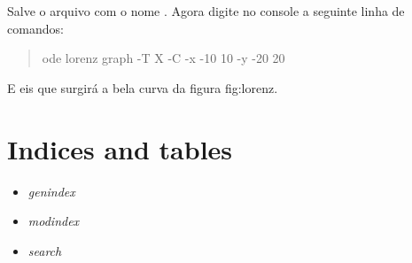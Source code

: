 \documentclass[a4paper,10pt,portuguese]{sphinxmanual}
\begin{document}
Salve o arquivo com o nome . Agora digite no console a
seguinte linha de comandos:
\begin{quote}

ode lorenz graph -T X -C -x -10 10 -y -20 20
\end{quote}

E eis que surgirá a bela curva da figura fig:lorenz.


\chapter{Indices and tables}
\label{index:indices-and-tables}\begin{itemize}
\item {} 
\emph{genindex}

\item {} 
\emph{modindex}

\item {} 
\emph{search}

\end{itemize}



\renewcommand{\indexname}{Índice}
\printindex
\end{document}
